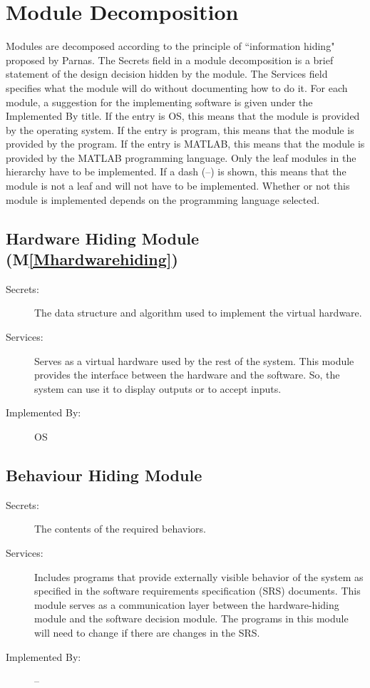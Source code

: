 \documentclass[12pt]{article}
\begin{document}
\section{Module Decomposition}
\label{Sec:MD}
Modules are decomposed according to the principle of ``information hiding" proposed by Parnas. The Secrets field in a module decomposition is a brief statement of the design decision hidden by the module. The Services field specifies what the module will do without documenting how to do it. For each module, a suggestion for the implementing software is given under the Implemented By title. If the entry is OS, this means that the module is provided by the operating system. If the entry is program, this means that the module is provided by the program. If the entry is MATLAB, this means that the module is provided by the MATLAB programming language. Only the leaf modules in the hierarchy have to be implemented. If a dash (--) is shown, this means that the module is not a leaf and will not have to be implemented. Whether or not this module is implemented depends on the programming language selected.
\subsection{Hardware Hiding Module (M\ref{Mhardwarehiding})}
\label{Sec:HHM()}
\begin{description}
\item[Secrets:]The data structure and algorithm used to implement the virtual hardware.
\item[Services:]Serves as a virtual hardware used by the rest of the system. This module provides the interface between the hardware and the software. So, the system can use it to display outputs or to accept inputs.
\item[Implemented By:]OS
\end{description}
\subsection{Behaviour Hiding Module}
\label{Sec:BHM}
\begin{description}
\item[Secrets:]The contents of the required behaviors.
\item[Services:]Includes programs that provide externally visible behavior of the system as specified in the software requirements specification (SRS) documents. This module serves as a communication layer between the hardware-hiding module and the software decision module. The programs in this module will need to change if there are changes in the SRS.
\item[Implemented By:]--
\end{description}
\end{document}
